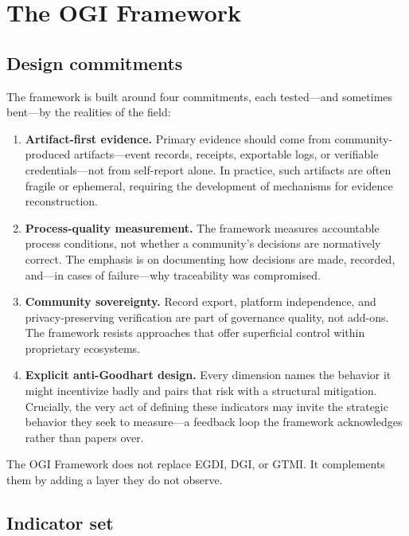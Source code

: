 \documentclass[sigconf,anonymous]{acmart}
\begin{document}
\section{The OGI Framework}

\subsection{Design commitments}

The framework is built around four commitments, each tested---and sometimes bent---by the realities of the field:
\begin{enumerate}
\item \textbf{Artifact-first evidence.} Primary evidence should come from community-produced artifacts---event records, receipts, exportable logs, or verifiable credentials---not from self-report alone. In practice, such artifacts are often fragile or ephemeral, requiring the development of mechanisms for evidence reconstruction.
\item \textbf{Process-quality measurement.} The framework measures accountable process conditions, not whether a community's decisions are normatively correct. The emphasis is on documenting how decisions are made, recorded, and---in cases of failure---why traceability was compromised.
\item \textbf{Community sovereignty.} Record export, platform independence, and privacy-preserving verification are part of governance quality, not add-ons. The framework resists approaches that offer superficial control within proprietary ecosystems.
\item \textbf{Explicit anti-Goodhart design.} Every dimension names the behavior it might incentivize badly and pairs that risk with a structural mitigation. Crucially, the very act of defining these indicators may invite the strategic behavior they seek to measure---a feedback loop the framework acknowledges rather than papers over.
\end{enumerate}

The OGI Framework does not replace EGDI, DGI, or GTMI. It complements them by adding a layer they do not observe.

\subsection{Indicator set}
\end{document}
